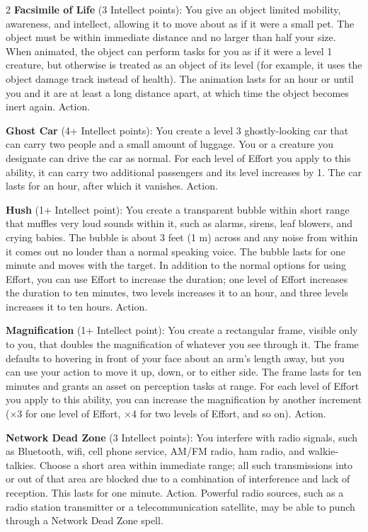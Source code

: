 \begin{multicols}{2}
\textbf{Facsimile of Life} (3 Intellect points): You give an object limited mobility, awareness, and intellect, allowing it to move about as if it were a small pet. The object must be within immediate distance and no larger than half your size. When animated, the object can perform tasks for you as if it were a level 1 creature, but otherwise is treated as an object of its level (for example, it uses the object damage track instead of health). The animation lasts for an hour or until you and it are at least a long distance apart, at which time the object becomes inert again. Action. 

\textbf{Ghost Car }(4+ Intellect points): You create a level 3 ghostly-looking car that can carry two people and a small amount of luggage. You or a creature you designate can drive the car as normal. For each level of Effort you apply to this ability, it can carry two additional passengers and its level increases by 1. The car lasts for an hour, after which it vanishes. Action. 

\textbf{Hush} (1+ Intellect point): You create a transparent bubble within short range that muffles very loud sounds within it, such as alarms, sirens, leaf blowers, and crying babies. The bubble is about 3 feet (1 m) across and any noise from within it comes out no louder than a normal speaking voice. The bubble lasts for one minute and moves with the target. In addition to the normal options for using Effort, you can use Effort to increase the duration; one level of Effort increases the duration to ten minutes, two levels increases it to an hour, and three levels increases it to ten hours. Action. 

\textbf{Magnification} (1+ Intellect point): You create a rectangular frame, visible only to you, that doubles the magnification of whatever you see through it. The frame defaults to hovering in front of your face about an arm’s length away, but you can use your action to move it up, down, or to either side. The frame lasts for ten minutes and grants an asset on perception tasks at range. For each level of Effort you apply to this ability, you can increase the magnification by another increment (×3 for one level of Effort, ×4 for two levels of Effort, and so on). Action. 

\textbf{Network Dead Zone} (3 Intellect points): You interfere with radio signals, such as Bluetooth, wifi, cell phone service, AM/FM radio, ham radio, and walkie-talkies. Choose a short area within immediate range; all such transmissions into or out of that area are blocked due to a combination of interference and lack of reception. This lasts for one minute. Action. 
Powerful radio sources, such as a radio station transmitter or a telecommunication satellite, may be able to punch through a Network Dead Zone spell.


\end{multicols}
